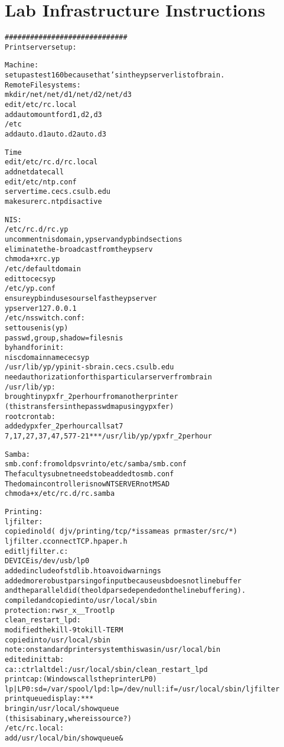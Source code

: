 \chapter{Lab Infrastructure Instructions} \label{ap:lab_infrastructure}

\begin{alltt}
\normalfont
\singlespacing
#############################
Printserver setup:

Machine:
  setup as test160 because that's in the ypserver list of brain.
Remote File systems:
 mkdir /net /net/d1 /net/d2 /net/d3
 edit /etc/rc.local
   add automount for d1, d2, d3
 /etc
   add auto.d1 auto.d2 auto.d3

Time
  edit /etc/rc.d/rc.local
    add netdate call
  edit /etc/ntp.conf
    server time.cecs.csulb.edu
  make sure rc.ntpd is active

NIS:
  /etc/rc.d/rc.yp
    uncomment nisdomain, ypserv and ypbind sections
    eliminate the -broadcast from the ypserv
    chmod a+x rc.yp
  /etc/defaultdomain
    edit to cecsyp
  /etc/yp.conf
    ensure ypbind uses ourself as the ypserver
    ypserver 127.0.0.1
  /etc/nsswitch.conf:
    set to use nis (yp)
     passwd,group,shadow = files nis
  byhand for init:
    niscdomainname cecsyp
  /usr/lib/yp/ypinit -s brain.cecs.csulb.edu
    need authorization for this particular server from brain
  /usr/lib/yp:
    brought in ypxfr_2perhour from another printer
     (this transfers in the passwd map using ypxfer)
  root crontab:
    added ypxfer_2perhour calls at 7
     7,17,27,37,47,57 7-21 * * * /usr/lib/yp/ypxfr_2perhour

Samba:
  smb.conf: from old psvr into /etc/samba/smb.conf
   The faculty subnet needs to be added to smb.conf
   The domain controller is now NTSERVER not MSAD
  chmod a+x /etc/rc.d/rc.samba

Printing:
  ljfilter:
    copied in old (~djv/printing/tcp/* is same as ~prmaster/src/*)
      ljfilter.c connectTCP.h paper.h
    edit ljfilter.c:
      DEVICE is /dev/usb/lp0
      added include of stdlib.h to avoid warnings
      added more robust parsing of input because usb does not line buffer
       and the parallel did (the old parse depended on the line buffering).
    compiled and copied into /usr/local/sbin
       protection: rwsr_x__T root lp
  clean_restart_lpd:
    modified the kill -9 to kill -TERM
    copied into /usr/local/sbin
      note: on standard printer system this was in /usr/local/bin
    edited inittab:
      ca::ctrlaltdel:/usr/local/sbin/clean_restart_lpd
  printcap: (Windows calls the printer LP0)
   lp|LP0:sd=/var/spool/lpd:lp=/dev/null:if=/usr/local/sbin/ljfilter
  print queue display: ***
    bring in /usr/local/showqueue
      (this is a binary, where is source?)
    /etc/rc.local:
      add /usr/local/bin/showqueue &


\end{alltt}
